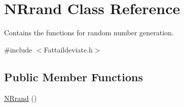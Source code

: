 \hypertarget{class_n_rrand}{}\section{N\+Rrand Class Reference}
\label{class_n_rrand}


Contains the functions for random number generation.  




{\ttfamily \#include $<$Fattaildeviate.\+h$>$}

\subsection*{Public Member Functions}
\begin{DoxyCompactItemize}
\item 
\hyperlink{class_n_rrand_a674521c4c29a6cb692f343ea9cf6a40c}{N\+Rrand} ()\hypertarget{class_n_rrand_a674521c4c29a6cb692f343ea9cf6a40c}{}\label{class_n_rrand_a674521c4c29a6cb692f343ea9cf6a40c}


\end{DoxyCompactItemize}
